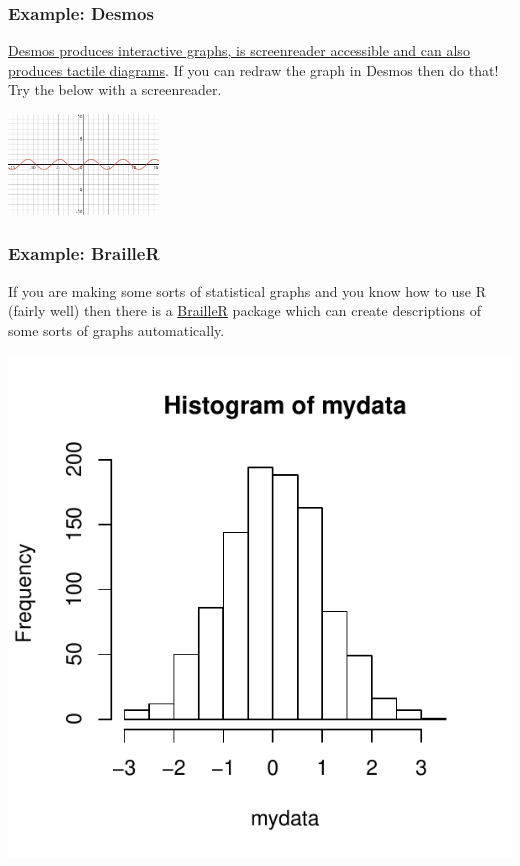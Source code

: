 \documentclass[
  10pt,
  a4paper]{article}
\begin{document}
\hypertarget{example-desmos}{%
\subsubsection{Example: Desmos}\label{example-desmos}}

\href{https://www.desmos.com/accessibility}{Desmos produces interactive graphs, is screenreader accessible and can also produces tactile diagrams}. If you can redraw the graph in Desmos then do that! Try the below with a screenreader.

\includegraphics[width=0.3\textwidth,height=\textheight]{./desmos-sine-graph.png}

\hypertarget{example-brailler}{%
\subsubsection{Example: BrailleR}\label{example-brailler}}

If you are making some sorts of statistical graphs and you know how to use R (fairly well) then there is a \href{https://github.com/ajrgodfrey/BrailleR}{BrailleR} package which can create descriptions of some sorts of graphs automatically.

\includegraphics{./Figs/myhist2.svg.pdf}
\end{document}
